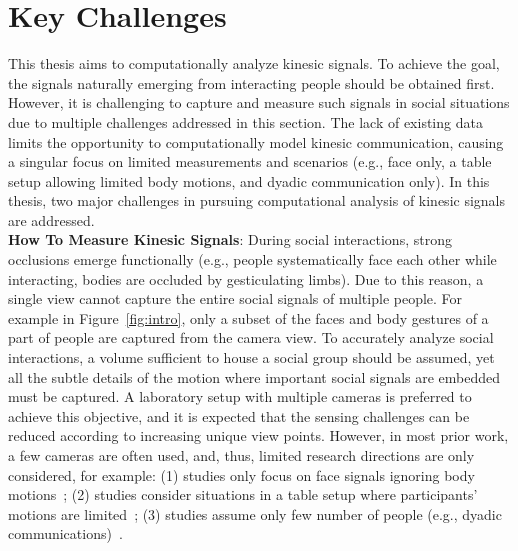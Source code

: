 \section{Key Challenges}
This thesis aims to computationally analyze kinesic signals. To achieve the goal, the signals naturally emerging from interacting people should be obtained first. However, it is challenging to capture and measure such signals in social situations due to multiple challenges addressed in this section. The lack of existing data limits the opportunity to computationally model kinesic communication, causing a singular focus on limited measurements and scenarios (e.g., face only, a table setup allowing limited body motions, and dyadic communication only). In this thesis, two major challenges in pursuing computational analysis of kinesic signals are addressed.\\ %

\noindent \textbf{How To Measure Kinesic Signals}:  
During social interactions, strong occlusions emerge functionally (e.g., people systematically face each other while interacting, bodies are occluded by gesticulating limbs). Due to this reason, a single view cannot capture the entire social signals of multiple people. For example in Figure~\ref{fig:intro}, only a subset of the faces and body gestures of a part of people are captured from the camera view. To accurately analyze social interactions, a volume sufficient to house a social group should be assumed, yet all the subtle details of the motion where important social signals are embedded must be captured. A laboratory setup with multiple cameras is preferred to achieve this objective, and it is expected that the sensing challenges can be reduced according to increasing unique view points. However, in most prior work, a few cameras are often used, and, thus, limited research directions are only considered, for example: (1) studies only focus on face signals ignoring body motions~\cite{messinger2009automated, lucas_trust_2016,mckeown2012semaine}; (2) studies consider situations in a table setup where participants' motions are limited~\cite{carletta2005ami, Lepri-12,messinger2009automated, nojavanasghari2016emoreact, lucas_trust_2016,mckeown2012semaine}; (3) studies assume only few number of people (e.g., dyadic communications)~\cite{messinger2009automated,nojavanasghari2016emoreact, lucas_trust_2016, katsimerou2016crowdsourcing,mckeown2012semaine,gunes2006bimodal}.

